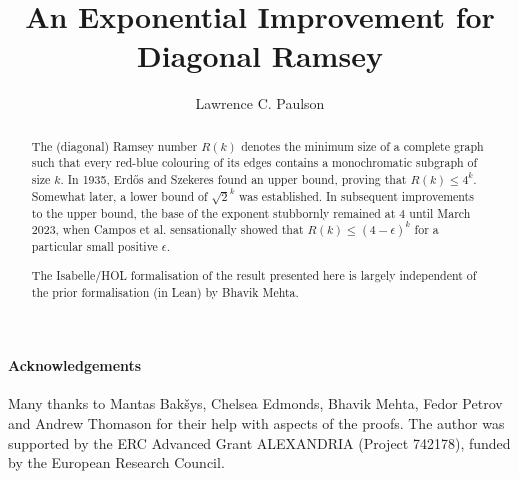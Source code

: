 \documentclass[11pt,a4paper]{article}
\begin{document}
\title{An Exponential Improvement for Diagonal Ramsey}
\author{Lawrence C. Paulson}
\maketitle

\begin{abstract}

The (diagonal) Ramsey number $R(k)$ denotes the minimum size of a complete graph such that every red-blue colouring of its edges contains a monochromatic subgraph of size $k$.
In 1935, Erd\H{o}s and Szekeres found an upper bound, proving that $R(k)\le 4^k$. Somewhat later, a lower bound of $\sqrt{2}^k$ was established.
In subsequent improvements to the upper bound, the base of the exponent stubbornly 
remained at 4 until March 2023, when Campos et al. \cite{campos-exponential-ramsey}
sensationally showed that $R(k)\le (4-\epsilon)^k$ for a particular
small positive $\epsilon$.

The Isabelle/HOL formalisation of the result presented here is largely
independent of the prior formalisation (in Lean) by Bhavik Mehta.
\end{abstract}

\newpage
\tableofcontents

\paragraph*{Acknowledgements}
Many thanks to Mantas Bakšys, Chelsea Edmonds, Bhavik Mehta, Fedor Petrov and Andrew Thomason for their help with aspects of the proofs.
The author was supported by the ERC Advanced Grant ALEXANDRIA (Project 742178), funded by the European Research Council. 

\newpage





\end{document}
